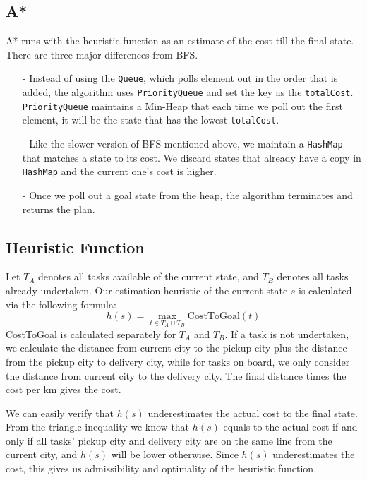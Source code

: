 \documentclass[11pt]{article}
\begin{document}
\subsection{A*}
A* runs with the heuristic function as an estimate of the cost till the final state. There are three major differences from BFS.
\begin{enumerate}
	\item[-] Instead of using the \texttt{Queue}, which polls element out in the order that is added, the algorithm uses \texttt{PriorityQueue} and set the key as the \texttt{totalCost}. \texttt{PriorityQueue} maintains a Min-Heap that each time we poll out the first element, it will be the state that has the lowest \texttt{totalCost}.
	\item[-] Like the slower version of BFS mentioned above, we maintain a \texttt{HashMap} that matches a state to its cost. We discard states that already have a copy in \texttt{HashMap} and the current one's cost is higher.
	\item[-] Once we poll out a goal state from the heap, the algorithm terminates and returns the plan.
\end{enumerate}

\subsection{Heuristic Function}
Let $T_A$ denotes all tasks available of the current state, and $T_B$ denotes all tasks already undertaken.
Our estimation heuristic of the current state $s$ is calculated via the following formula:
$$h(s) = \max_{t \in T_A\cup T_B} \mathrm{CostToGoal}(t)$$
CostToGoal is calculated separately for $T_A$ and $T_B$. If a task is not undertaken, we calculate the distance from current city to the pickup city plus the distance from the pickup city to delivery city, while for tasks on board, we only consider the distance from current city to the delivery city. The final distance times the cost per km gives the cost.

We can easily verify that $h(s)$ underestimates the actual cost to the final state. From the triangle inequality we know that $h(s)$ equals to the actual cost if and only if all tasks' pickup city and delivery city are on the same line from the current city, and $h(s)$ will be lower otherwise. Since $h(s)$ underestimates the cost, this gives us admissibility and optimality of the heuristic function.
\end{document}
